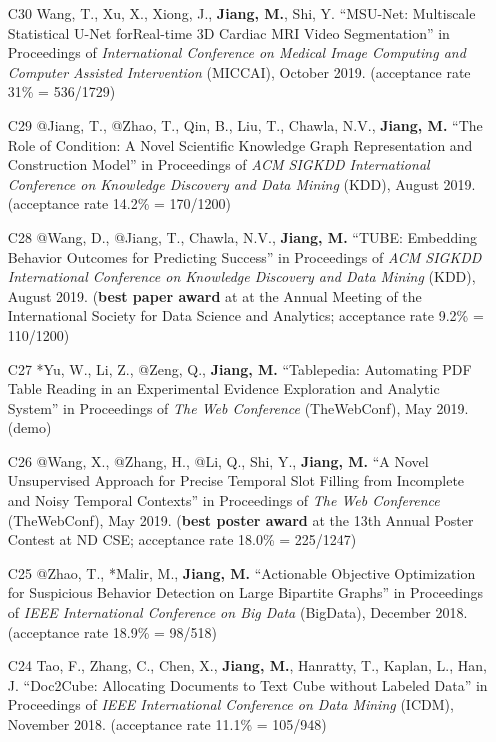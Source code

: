 \documentclass[10pt]{article}
\newenvironment{myindentpar}[1]%
{\begin{list}{}%
         {\setlength{\leftmargin}{#1}}%
         \item[]%
}
{\end{list}}
\newcounter{list}
\begin{document}
\begin{myindentpar}{0.00cm}
\begin{enumerate}[leftmargin=.5cm]
\item[C30] Wang, T., Xu, X., Xiong, J., \textbf{Jiang, M.}, Shi, Y. ``MSU-Net: Multiscale Statistical U-Net forReal-time 3D Cardiac MRI Video Segmentation'' in Proceedings of \textit{International Conference on Medical Image Computing and Computer Assisted Intervention} (MICCAI), October 2019. (acceptance rate 31\% = 536/1729)

\item[C29] @Jiang, T., @Zhao, T., Qin, B., Liu, T., Chawla, N.V., \textbf{Jiang, M.} ``The Role of Condition: A Novel Scientific Knowledge Graph Representation and Construction Model'' in Proceedings of \textit{ACM SIGKDD International Conference on Knowledge Discovery and Data Mining} (KDD), August 2019. (acceptance rate 14.2\% = 170/1200)

\item[C28] @Wang, D., @Jiang, T., Chawla, N.V., \textbf{Jiang, M.} ``TUBE: Embedding Behavior Outcomes for Predicting Success'' in Proceedings of \textit{ACM SIGKDD International Conference on Knowledge Discovery and Data Mining} (KDD), August 2019. (\textbf{best paper award} at at the Annual Meeting of the International Society for Data Science and Analytics; acceptance rate 9.2\% = 110/1200)
	
\item[C27] *Yu, W., Li, Z., @Zeng, Q., \textbf{Jiang, M.} ``Tablepedia: Automating PDF Table Reading in an Experimental Evidence Exploration and Analytic System'' in Proceedings of \textit{The Web Conference} (TheWebConf), May 2019. (demo)
	
\item[C26] @Wang, X., @Zhang, H., @Li, Q., Shi, Y., \textbf{Jiang, M.} ``A Novel Unsupervised Approach for Precise Temporal Slot Filling from Incomplete and Noisy Temporal Contexts'' in Proceedings of \textit{The Web Conference} (TheWebConf), May 2019. (\textbf{best poster award} at the 13th Annual Poster Contest at ND CSE; acceptance rate 18.0\% = 225/1247)

\item[C25] @Zhao, T., *Malir, M., \textbf{Jiang, M.} ``Actionable Objective Optimization for Suspicious Behavior Detection on Large Bipartite Graphs'' in Proceedings of \textit{IEEE International Conference on Big Data} (BigData), December 2018. (acceptance rate 18.9\% = 98/518)

\item[C24] Tao, F., Zhang, C., Chen, X., \textbf{Jiang, M.}, Hanratty, T., Kaplan, L., Han, J. ``Doc2Cube: Allocating Documents to Text Cube without Labeled Data'' in Proceedings of \textit{IEEE International Conference on Data Mining} (ICDM), November 2018. (acceptance rate 11.1\% = 105/948)


\end{enumerate}
\end{myindentpar}
\end{document}
